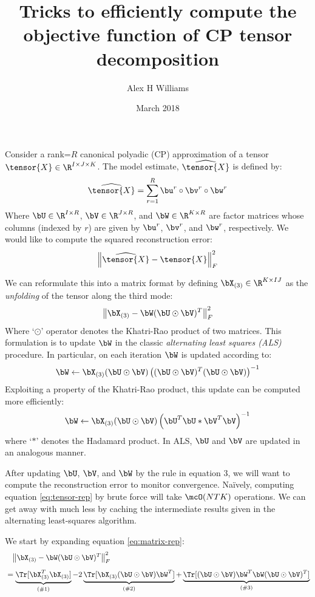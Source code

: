 \documentclass{article}
\title{Tricks to efficiently compute the objective function of CP tensor decomposition}
\author{Alex H Williams}
\date{March 2018}
\begin{document}
\maketitle

Consider a rank=$R$ canonical polyadic (CP) approximation of a tensor $\tensor{X} \in \R^{I \times J \times K}$. The model estimate, $\widehat{\tensor{X}}$ is defined by:
\begin{equation}
\label{eq:tensor-rep}
\widehat{\tensor{X}} = \sum_{r=1}^R \bu^r \circ \bv^r \circ \bw^r
\end{equation}
Where $\bU \in \R^{I \times R}$, $\bV \in \R^{J \times R}$, and $\bW \in \R^{K \times R}$ are factor matrices whose columns (indexed by $r$) are given by $\bu^r$, $\bv^r$, and $\bw^r$, respectively. We would like to compute the squared reconstruction error:
\[
\left \lVert \widehat{\tensor{X}} - \tensor{X} \right \lVert_F^2
\]

We can reformulate this into a matrix format by defining $\bX_{(3)} \in \R^{K \times IJ}$ as the \textit{unfolding} of the tensor along the third mode:
\begin{equation}
\label{eq:matrix-rep}
\left \lVert \bX_{(3)} - \bW (\bU \odot \bV)^T \right \lVert_F^2
\end{equation}
Where `$\odot$' operator denotes the Khatri-Rao product of two matrices.
This formulation is to update $\bW$ in the classic \textit{alternating least squares (ALS)} procedure.
In particular, on each iteration $\bW$ is updated according to:
\[
\bW \leftarrow \bX_{(3)} (\bU \odot \bV) \left ( (\bU \odot \bV)^T (\bU \odot \bV) \right )^{-1}
\]
Exploiting a property of the Khatri-Rao product, this update can be computed more efficiently:
\begin{equation}
\label{eq:update}
\bW \leftarrow \bX_{(3)} (\bU \odot \bV) \left ( \bU^T \bU * \bV^T \bV \right )^{-1}
\end{equation}
where `$*$' denotes the Hadamard product.
In ALS, $\bU$ and $\bV$ are updated in an analogous manner.

After updating $\bU$, $\bV$, and $\bW$ by the rule in equation 3, we will want to compute the reconstruction error to monitor convergence.
Na\"ively, computing equation \ref{eq:tensor-rep} by brute force will take $\mcO(NTK)$ operations.
We can get away with much less by caching the intermediate results given in the alternating least-squares algorithm.

We start by expanding equation \ref{eq:matrix-rep}:
\begin{align*}
&\phantom{=} \left \lVert \bX_{(3)} - \bW (\bU \odot \bV)^T \right \lVert_F^2 \\[.5em]
&= \underbrace{\Tr [ \bX_{(3)}^T \bX_{(3)} ]}_{(\#1)} - 2 \underbrace{\Tr [ \bX_{(3)} (\bU \odot \bV) \bW^T]}_{(\#2)} + \underbrace{\Tr [ (\bU \odot \bV) \bW^T \bW (\bU \odot \bV)^T ]}_{(\#3)}
\end{align*}
\end{document}

